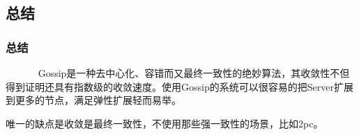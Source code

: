 \documentclass[slidestop,compress,mathserif,c]{beamer}
\begin{document}
\subsection{\hfill 总结}
\begin{frame}
\frametitle{总结}
~~~~~~ Gossip是一种去中心化、容错而又最终一致性的绝妙算法，其收敛性不但得到证明还具有指数级的收敛速度。使用Gossip的系统可以很容易的把Server扩展到更多的节点，满足弹性扩展轻而易举。
 
唯一的缺点是收敛是最终一致性，不使用那些强一致性的场景，比如2pc。
\end{frame}


% 
%
%
%
% 
%
%
% 
%
%
% 
%
%
\end{document}
